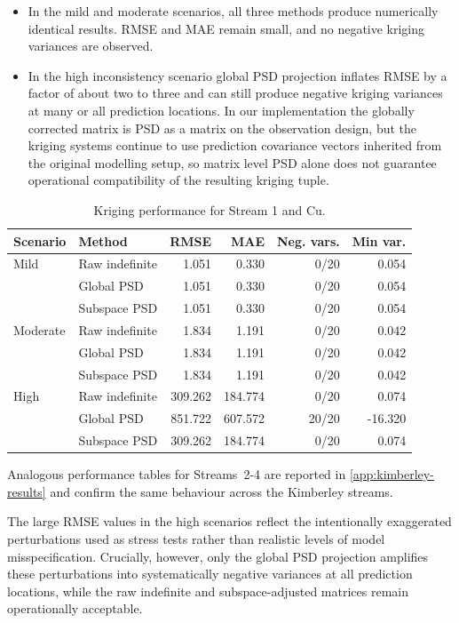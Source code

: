 \documentclass[smallextended]{svjour3}
\newcommand{\1}{\mathbf{1}}
\begin{document}
\begin{itemize}
	\item In the mild and moderate scenarios, all three methods produce numerically  identical results. RMSE and MAE remain small, and no negative kriging variances are observed.
	
	\item In the high inconsistency scenario global PSD projection inflates RMSE by a factor of about two to three and can still produce negative kriging variances at many or all prediction locations. In our implementation the globally corrected matrix is PSD as a matrix on the observation design, but the kriging systems continue to use prediction covariance vectors inherited from the original modelling setup, so matrix level PSD alone does not guarantee operational compatibility of 	the resulting kriging tuple.
\end{itemize}

\begin{table}[htbp]
	\centering
	\caption{Kriging performance for Stream 1 and Cu.}
	\label{tab:performance_stream_1_Cu}
	\begin{tabular}{llrrrr}
		\hline
		Scenario & Method & RMSE & MAE & Neg. vars. & Min var. \\
		\hline
		Mild & Raw indefinite & 1.051 & 0.330 & 0/20 &  0.054 \\
		& Global PSD     & 1.051 & 0.330 & 0/20 &  0.054 \\
		& Subspace PSD   & 1.051 & 0.330 & 0/20 &  0.054 \\
		\hline
		Moderate & Raw indefinite & 1.834 & 1.191 & 0/20 &  0.042 \\
		& Global PSD     & 1.834 & 1.191 & 0/20 &  0.042 \\
		& Subspace PSD   & 1.834 & 1.191 & 0/20 &  0.042 \\
		\hline
		High & Raw indefinite & 309.262 & 184.774 & 0/20 &   0.074 \\
		& Global PSD     & 851.722 & 607.572 & 20/20 & -16.320 \\
		& Subspace PSD   & 309.262 & 184.774 & 0/20 &   0.074 \\
		\hline
	\end{tabular}
\end{table}

Analogous performance tables for Streams~2-4 are reported in \ref{app:kimberley-results} and confirm the same behaviour across the Kimberley streams.

The large RMSE values in the high scenarios reflect the intentionally exaggerated perturbations used as stress tests rather than realistic levels of model misspecification. Crucially, however, only the global PSD projection amplifies these perturbations into systematically negative variances at all prediction locations, while the raw indefinite and subspace-adjusted matrices remain operationally acceptable.
\end{document}
